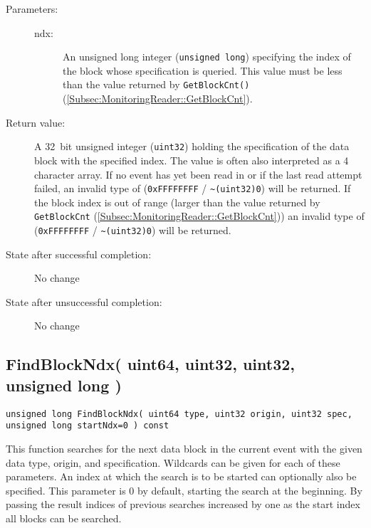 \documentclass[a4paper,twoside]{article}
\begin{document}
\begin{description}
\item[Parameters:]
	\begin{description}
		\item[ndx:] An unsigned long integer (\texttt{unsigned long}) specifying the index of the block whose specification is queried.
		This value must be less than the value returned by \texttt{GetBlockCnt()} (\ref{Subsec:MonitoringReader::GetBlockCnt}).
	\end{description}
\item[Return value:] A 32~bit unsigned integer (\texttt{uint32}) holding the specification of the data block with the specified index. The value is often also interpreted as a 4
character array.
If no event has yet been read in or if the last read attempt failed, an invalid type of (\texttt{0xFF\-FF\-FF\-FF} / \texttt{\~{ }(uint32)0}) 
will be returned.
If the block index is out of range (larger than the value returned by \texttt{GetBlockCnt} (\ref{Subsec:MonitoringReader::GetBlockCnt}))
an invalid type of (\texttt{0xFF\-FF\-FF\-FF} / \texttt{\~{ }(uint32)0}) will be returned.
\item[State after successful completion:] No change
\item[State after unsuccessful completion:] No change
\end{description}


\subsection{FindBlockNdx( uint64, uint32, uint32, unsigned long )}

\texttt{unsigned long FindBlockNdx( uint64 type, uint32 origin, uint32 spec, unsigned long startNdx=0 ) const}

This function searches for the next data block in the current event with the given data type, origin, and specification. Wildcards can be given
for each of these parameters. An index at which the search is to be started can optionally also be specified. This parameter is 0 by default,
starting the search at the beginning. By passing the result indices of previous searches increased by one as the start index all blocks can be searched.
\end{document}

